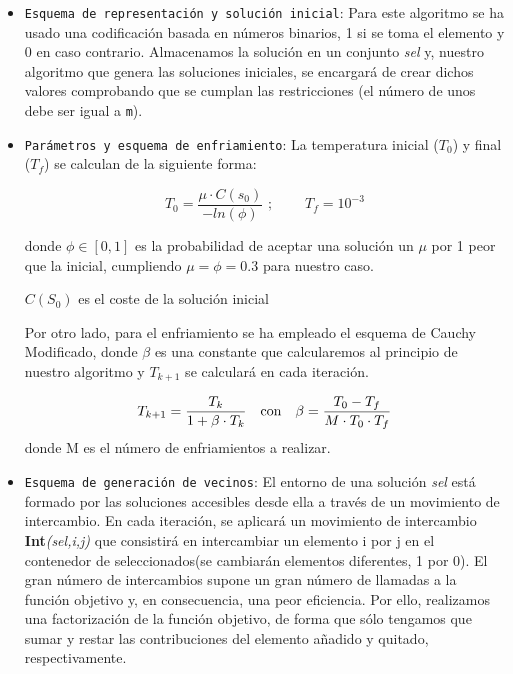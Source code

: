 \begin{itemize}
	\item \texttt{Esquema de representación y solución inicial}: Para este algoritmo se ha usado una codificación basada en números binarios, 1 si se toma el elemento y 0 	en caso contrario. Almacenamos la solución en un conjunto \textit{sel} y,  nuestro algoritmo que genera las soluciones iniciales, se encargará de crear dichos valores comprobando que se cumplan las restricciones (el número de unos debe ser igual a \texttt{m}).
	
	\item \texttt{Parámetros y esquema de enfriamiento}: 
	La temperatura inicial ($T_0$) y final ($T_f$) se calculan de la siguiente forma:
	
	\[  
		T_0 = \frac{\mu \cdot C(s_0)}{-ln(\phi)}   \text{    ;} \hspace{1cm} T_f = 10^{-3}
	\]
	
	donde $\phi \in [0,1]$ es la probabilidad de aceptar una solución un $\mu$ por 1 peor que la inicial, cumpliendo  $\mu = \phi = 0.3$ para nuestro caso. 
	
	
	$C(S_0)$ es el coste de la solución inicial 
	
	
	Por otro lado, para el enfriamiento se ha empleado el esquema de Cauchy Modificado, donde $\beta$ es una constante que calcularemos al principio de nuestro algoritmo y $T_{k+1}$ se calculará en cada iteración.
	
	\[  
	T_{k+1} = \frac{T_k}{1 + \beta \cdot T_k} \hspace{0.35cm} \text{con} \hspace{0.35cm} \beta = \frac{T_0 - T_f}{M \cdot T_0\cdot T_f}   
	\]
	donde M es el número de enfriamientos a realizar.
	
	\item \texttt{Esquema de generación de vecinos}:
	El entorno de una solución \textit{sel} está formado por las soluciones accesibles desde ella a través de un movimiento de intercambio.
	En cada iteración, se aplicará un movimiento de intercambio \textbf{Int}\textit{(sel,i,j)} que consistirá en intercambiar un elemento i por j en el contenedor de seleccionados(se cambiarán elementos diferentes, 1 por 0). El gran número de intercambios supone un gran número de llamadas a la función objetivo y, en consecuencia, una peor eficiencia. Por ello, realizamos una factorización de la función objetivo, de forma que sólo tengamos que sumar y restar las contribuciones del elemento añadido y quitado, respectivamente.
\end{itemize}



